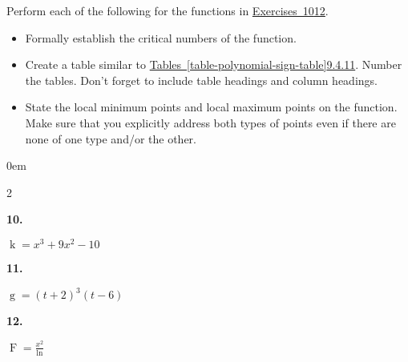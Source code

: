 \documentclass[12pt,]{book}
\theoremstyle{plain}
\theoremstyle{definition}
\numberwithin{equation}{section}
\newenvironment{exercisegroup}%
{\medskip\noindent}%
{\par\bigskip}%
\newlength{\exercisegroupindent}%
\newlength{\exercisegroupitemwidth}%
\newenvironment{exercisegrouplist}%
{\vspace{-\partopsep}%
\begin{adjustwidth}{\exercisegroupindent}{0em}}%
{\end{adjustwidth}%
\vspace{-\partopsep}%
\vspace{\baselineskip}}%
\newenvironment{exercisegroupbycol}[1]%
{\begin{exercisegrouplist}%
\vspace{-\multicolsep}%
\begin{multicols}{#1}%
\setlength{\parindent}{0em}%
\setlength{\exercisegroupitemwidth}{\linewidth}}%
{\end{multicols}%
\vspace{-\multicolsep}%
\end{exercisegrouplist}}%
\newenvironment{exercisegroupitem}[1]%
{\begin{minipage}[t]{\exercisegroupitemwidth}
\vspace{0pt}%
{\bfseries#1}%
\rule{0pt}{\baselineskip}}{\strut%
\end{minipage}%
\hspace{\columnsep}}%
\providecommand\phantomsection{}
\newcommand{\fe}[2]{\mathop{{#1}{\left(#2\right)}}}
\begin{document}
\begin{exercisegroup}%
Perform each of the following for the functions in \hyperref[exercise-make-sign-table-first]{Exercises~10}\textendash{}\hyperref[exercise-make-sign-table-last]{12}.%
\begin{itemize}[label=\textbullet]
\item{}Formally establish the critical numbers of the function.\item{}Create a table similar to \hyperref[table-polynomial-sign-table]{Tables~\ref*{table-polynomial-sign-table}}\textendash{}\hyperref[table-trient-rational-sign-table]{9.4.11}. Number the tables.  Don't forget to include table headings and column headings.\item{}State the local minimum points and local maximum points on the function.  Make sure that you explicitly address both types of points even if there are none of one type and/or the other.\end{itemize}
\par
\begin{exercisegroupbycol}{2}%
\begin{exercisegroupitem}{10. }\phantomsection\hypertarget{exercise-make-sign-table-first}{\null}
\(\fe{k}{x}=x^3+9x^2-10\)%
\end{exercisegroupitem}%
\par%
\begin{exercisegroupitem}{11. }\phantomsection\hypertarget{exercise-422}{\null}
\(\fe{g}{t}=(t+2)^3(t-6)\)%
\end{exercisegroupitem}%
\par%
\begin{exercisegroupitem}{12. }\phantomsection\hypertarget{exercise-make-sign-table-last}{\null}
\(\fe{F}{x}=\frac{x^2}{\fe{\ln}{x}}\)%
\end{exercisegroupitem}%
\par%
\end{exercisegroupbycol}%
\end{exercisegroup}%
\end{document}

